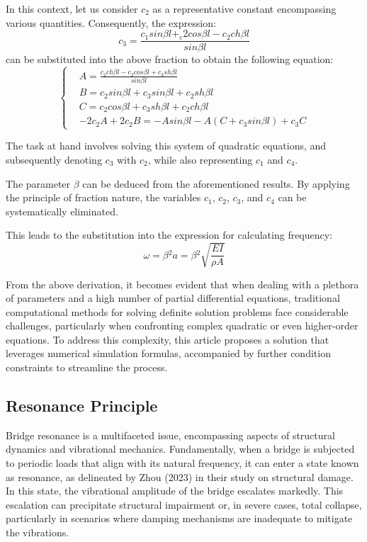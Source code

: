 \documentclass[conference]{IEEEtran}
\begin{document}
In this context, let us consider $c_2$ as a representative constant encompassing various quantities. Consequently, the expression:
\begin{equation}
c_3=\frac{c_1sin\beta{}l+_c2cos\beta{}l-c_2ch\beta{}l}{sin\beta{}l}
\end{equation}
can be substituted into the above fraction to obtain the following equation:
\begin{equation}
\left\{
\begin{aligned}
& A=\frac{c_2ch\beta{}l-c_2cos\beta{}l+c_3sh\beta{}l}{sin\beta{}l} \\
& B=c_2sin\beta{}l+c_3sin\beta{}l+c_2sh\beta{}l \\
& C=c_2cos\beta{}l+c_3sh\beta{}l+c_2ch\beta{}l \\
& -2c_2A+2c_2B=-Asin\beta{}l-A(C+c_3sin\beta{}l)+c_3C
\end{aligned}
\right.
\end{equation}

The task at hand involves solving this system of quadratic equations, and subsequently denoting $c_3$ with $c_2$, while also representing $c_1$ and $c_4$.

The parameter $\beta$ can be deduced from the aforementioned results. By applying the principle of fraction nature, the variables $c_1$, $c_2$, $c_3$, and $c_4$ can be systematically eliminated.

This leads to the substitution into the expression for calculating frequency:
\begin{equation}
\omega{}=\beta{}^{2}a=\beta{}^{2}\sqrt{\frac{EI}{\rho{}A}}
\end{equation}

From the above derivation, it becomes evident that when dealing with a plethora of parameters and a high number of partial differential equations, traditional computational methods for solving definite solution problems face considerable challenges, particularly when confronting complex quadratic or even higher-order equations. To address this complexity, this article proposes a solution that leverages numerical simulation formulas, accompanied by further condition constraints to streamline the process.

\subsection{Resonance Principle}
Bridge resonance is a multifaceted issue, encompassing aspects of structural dynamics and vibrational mechanics. Fundamentally, when a bridge is subjected to periodic loads that align with its natural frequency, it can enter a state known as resonance, as delineated by Zhou (2023) in their study on structural damage\cite{zhou2023damage}. In this state, the vibrational amplitude of the bridge escalates markedly. This escalation can precipitate structural impairment or, in severe cases, total collapse, particularly in scenarios where damping mechanisms are inadequate to mitigate the vibrations.
\end{document}
